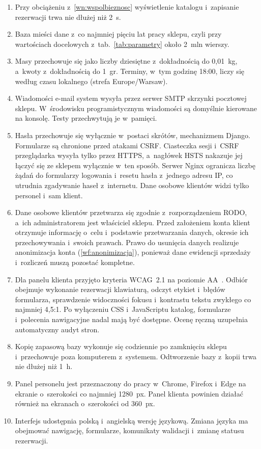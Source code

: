 \documentclass[12pt,a4paper,oneside]{article}
\newcounter{pu}
\begin{document}
\begin{enumerate}[label=WN\arabic*.,ref=WN\arabic*,leftmargin=1.6cm]
	\item \label{wn:wydajnosc} Przy obciążeniu z~\ref{wn:wspolbieznosc} wyświetlenie katalogu i~zapisanie rezerwacji trwa nie dłużej niż 2~s.
	\item Baza mieści dane z~co najmniej pięciu lat pracy sklepu, czyli przy wartościach docelowych z~tab.~\ref{tab:parametry} około 2~mln wierszy.
	\item \label{wn:czas} Masy przechowuje się jako liczby dziesiętne z~dokładnością do 0,01~kg, a~kwoty z~dokładnością do 1~gr. Terminy, w~tym godzinę 18:00, liczy się według czasu lokalnego (strefa Europe/Warsaw).
	\item \label{wn:poczta} Wiadomości e-mail system wysyła przez serwer SMTP skrzynki pocztowej sklepu. W~środowisku programistycznym wiadomości są domyślnie kierowane na konsolę. Testy przechwytują je w~pamięci.
	\item \label{wn:bezpieczenstwo} Hasła przechowuje się wyłącznie w~postaci skrótów, mechanizmem Django. Formularze są chronione przed atakami CSRF. Ciasteczka sesji i~CSRF przeglądarka wysyła tylko przez HTTPS, a~nagłówek HSTS nakazuje jej łączyć się ze sklepem wyłącznie w~ten sposób. Serwer Nginx ogranicza liczbę żądań do formularzy logowania i~resetu hasła z~jednego adresu IP, co utrudnia zgadywanie haseł z~internetu. Dane osobowe klientów widzi tylko personel i~sam klient.
	\item \label{wn:rodo} Dane osobowe klientów przetwarza się zgodnie z~rozporządzeniem RODO, a~ich administratorem jest właściciel sklepu. Przed założeniem konta klient otrzymuje informację o~celu i~podstawie przetwarzania danych, okresie ich przechowywania i~swoich prawach. Prawo do usunięcia danych realizuje anonimizacja konta (\ref{wf:anonimizacja}), ponieważ dane ewidencji sprzedaży i~rozliczeń muszą pozostać kompletne.
	\item \label{wn:dostepnosc} Dla panelu klienta przyjęto kryteria WCAG~2.1 na poziomie AA~\cite{wcag}. Odbiór obejmuje wykonanie rezerwacji klawiaturą, odczyt etykiet i~błędów formularza, sprawdzenie widoczności fokusu i~kontrastu tekstu zwykłego co najmniej 4,5:1. Po wyłączeniu CSS i~JavaScriptu katalog, formularze i~polecenia nawigacyjne nadal mają być dostępne. Ocenę ręczną uzupełnia automatyczny audyt stron.
	\item \label{wn:kopia} Kopię zapasową bazy wykonuje się codziennie po zamknięciu sklepu i~przechowuje poza komputerem z~systemem. Odtworzenie bazy z~kopii trwa nie dłużej niż 1~h.
	\item \label{wn:przegladarki} Panel personelu jest przeznaczony do pracy w~Chrome, Firefox i~Edge na ekranie o~szerokości co najmniej 1280~px. Panel klienta powinien działać również na ekranach o~szerokości od 360~px.
	\item Interfejs udostępnia polską i~angielską wersję językową. Zmiana języka ma obejmować nawigację, formularze, komunikaty walidacji i~zmianę statusu rezerwacji.
\end{enumerate}
\end{document}
